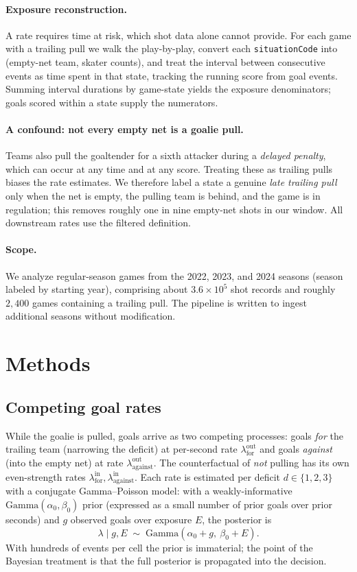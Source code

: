 \documentclass[11pt]{article}
\begin{document}
\paragraph{Exposure reconstruction.} A rate requires time at risk, which shot data
alone cannot provide. For each game with a trailing pull we walk the play-by-play,
convert each \texttt{situationCode} into (empty-net team, skater counts), and treat
the interval between consecutive events as time spent in that state, tracking the
running score from goal events. Summing interval durations by game-state yields the
exposure denominators; goals scored within a state supply the numerators.

\paragraph{A confound: not every empty net is a goalie pull.} Teams also pull the
goaltender for a sixth attacker during a \emph{delayed penalty}, which can occur at
any time and at any score. Treating these as trailing pulls biases the rate
estimates. We therefore label a state a genuine \emph{late trailing pull} only when
the net is empty, the pulling team is behind, and the game is in regulation; this
removes roughly one in nine empty-net shots in our window. All downstream rates use
the filtered definition.

\paragraph{Scope.} We analyze regular-season games from the 2022, 2023, and 2024
seasons (season labeled by starting year), comprising about $3.6\times10^5$ shot
records and roughly $2{,}400$ games containing a trailing pull. The pipeline is
written to ingest additional seasons without modification.

\section{Methods}

\subsection{Competing goal rates}

While the goalie is pulled, goals arrive as two competing processes: goals
\emph{for} the trailing team (narrowing the deficit) at per-second rate
$\lambda^{\mathrm{out}}_{\mathrm{for}}$ and goals \emph{against} (into the empty
net) at rate $\lambda^{\mathrm{out}}_{\mathrm{against}}$. The counterfactual of
\emph{not} pulling has its own even-strength rates
$\lambda^{\mathrm{in}}_{\mathrm{for}},\lambda^{\mathrm{in}}_{\mathrm{against}}$.
Each rate is estimated per deficit $d\in\{1,2,3\}$ with a conjugate Gamma--Poisson
model: with a weakly-informative $\mathrm{Gamma}(\alpha_0,\beta_0)$ prior
(expressed as a small number of prior goals over prior seconds) and $g$ observed
goals over exposure $E$, the posterior is
\[
\lambda \mid g, E \;\sim\; \mathrm{Gamma}(\alpha_0 + g,\ \beta_0 + E).
\]
With hundreds of events per cell the prior is immaterial; the point of the Bayesian
treatment is that the full posterior is propagated into the decision.
\end{document}
